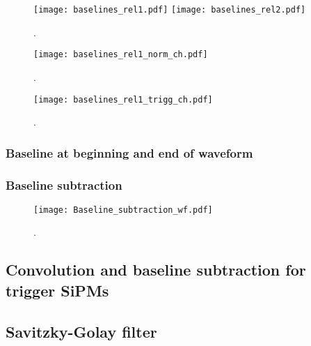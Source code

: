 \documentclass[11pt,a4paper,english,oneside, pdf]{article}
\begin{document}
	
	\begin{figure}[!h]
		\begin{center}
			\texttt{[image: baselines\_rel1.pdf]}
			\texttt{[image: baselines\_rel2.pdf]}
			\caption{.}
			\label{fig:baselines}
			\end{center}
	\end{figure}
	
	
	\begin{figure}[!h]
		\begin{center}
			\texttt{[image: baselines\_rel1\_norm\_ch.pdf]}
			\caption{.}
			\label{fig:baselines2}
		\end{center}
	\end{figure}

	\begin{figure}[!h]
		\begin{center}
			\texttt{[image: baselines\_rel1\_trigg\_ch.pdf]}
			\caption{.}
			\label{fig:baselines3}
		\end{center}
	\end{figure}
	
	
	
	\subsubsection{Baseline at beginning and end of waveform}
	
	
	\subsubsection{Baseline subtraction}
	
	
	
	\begin{figure}[!h]
		\begin{center}
			\texttt{[image: Baseline\_subtraction\_wf.pdf]}
			\caption{.}
			\label{fig:bsl_subt_wf}
		\end{center}
	\end{figure}
	
	
	
	\subsection{Convolution and baseline subtraction for trigger SiPMs}
	\label{conv_and_bsl_subt_sec}
	
	
	
	\subsection{Savitzky-Golay filter}
	\label{sg_filter_sec}
	
\end{document}
